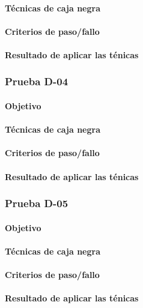 \documentclass[10pt,a4paper]{article}
\begin{document}
			\paragraph{Técnicas de caja negra}
			\paragraph{Criterios de paso/fallo}
			\paragraph{Resultado de aplicar las ténicas}
			\subsubsection{Prueba D-04}
			\paragraph{Objetivo}
			\paragraph{Técnicas de caja negra}
			\paragraph{Criterios de paso/fallo}
			\paragraph{Resultado de aplicar las ténicas}
			\subsubsection{Prueba D-05}
			\paragraph{Objetivo}
			\paragraph{Técnicas de caja negra}
			\paragraph{Criterios de paso/fallo}
			\paragraph{Resultado de aplicar las ténicas}
\end{document}
